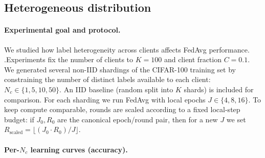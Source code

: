 \documentclass[10pt,twocolumn,letterpaper]{article}
\begin{document}
\subsection{Heterogeneous distribution}
\label{sec:hetero}

\paragraph{Experimental goal and protocol.}
We studied how label heterogeneity across clients affects FedAvg performance. \cite{mcmahan2017communication,hsu2019measuring,hsu2020federated}.Experiments fix the number of clients to \(K=100\) and client fraction \(C=0.1\). We generated several non-IID shardings of the CIFAR-100 training set by constraining the number of distinct labels available to each client: \(N_c\in\{1,5,10,50\}\). \cite{hsu2019measuring,hsu2020federated} An IID baseline (random split into \(K\) shards) is included for comparison. For each sharding we run FedAvg with local epochs \(J\in\{4,8,16\}\). To keep compute comparable, rounds are scaled according to a fixed local-step budget: if \(J_0,R_0\) are the canonical epoch/round pair, then for a new \(J\) we set \(R_{\mathrm{scaled}}=\lfloor (J_0\cdot R_0)/J\rfloor\). \cite{mccandlish2018empirical,you2017large,stich2020local} 










\paragraph{Per-\(N_c\) learning curves (accuracy).}
\end{document}
